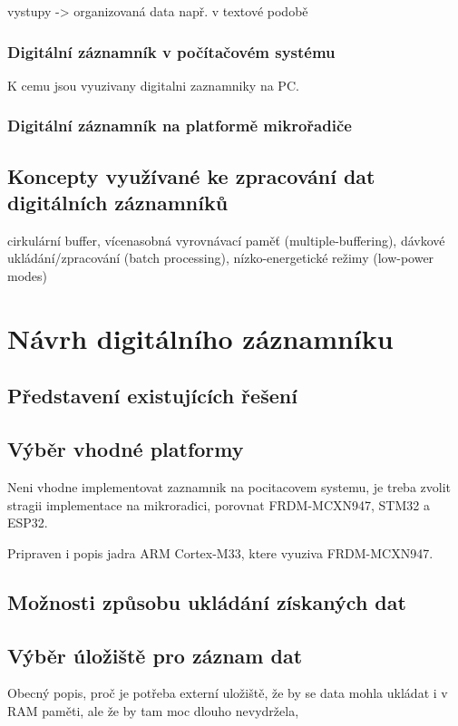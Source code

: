vystupy -> organizovaná data např. v textové podobě

\subsection{Digitální záznamník v počítačovém systému}
K cemu jsou vyuzivany digitalni zaznamniky na PC.

\subsection{Digitální záznamník na platformě mikrořadiče}

\section{Koncepty využívané ke zpracování dat digitálních záznamníků}
cirkulární buffer, vícenasobná vyrovnávací paměť (multiple-buffering), dávkové ukládání/zpracování (batch processing), nízko-energetické režimy 
(low-power modes)


\chapter{Návrh digitálního záznamníku}

\section{Představení existujících řešení}

\section{Výběr vhodné platformy}
Neni vhodne implementovat zaznamnik na pocitacovem systemu, je treba zvolit stragii implementace na mikroradici, porovnat FRDM-MCXN947, STM32 a ESP32. 

Pripraven i popis jadra ARM Cortex-M33, ktere vyuziva FRDM-MCXN947.

\section{Možnosti způsobu ukládání získaných dat}

\section{Výběr úložiště pro záznam dat}
Obecný popis, proč je potřeba externí uložiště, že by se data mohla ukládat i v RAM paměti, ale že by tam moc dlouho nevydržela, 

